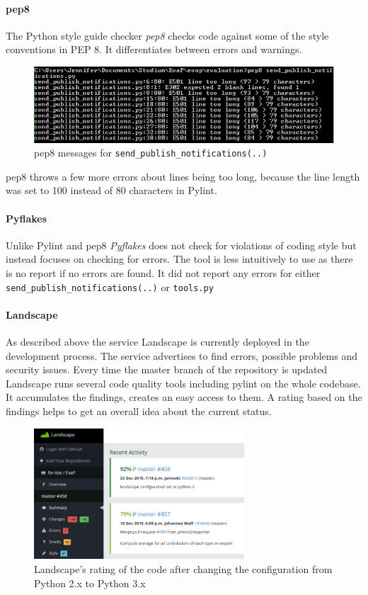 \paragraph{pep8}
The Python style guide checker \emph{pep8} checks code against some of the style conventions in PEP 8.
It differentiates between errors and warnings.
\begin{figure}[h]
    \centering
    \includegraphics[width=\textwidth, keepaspectratio]{graphics/pep8_send_publish_notifications_1}
    \caption{pep8 messages for \texttt{send\_publish\_notifications(..)}}
    \label{fig:pep8}
\end{figure} 
pep8 throws a few more errors about lines being too long, because the line length was set to 100 instead of 80 characters in Pylint.

\paragraph{Pyflakes}
Unlike Pylint and pep8 \emph{Pyflakes} does not check for violations of coding style but instead focuses on checking for errors.
The tool is less intuitively to use as there is no report if no errors are found. 
It did not report any errors for either \texttt{send\_publish\_notifications(..)} or \texttt{tools.py}

\paragraph{Landscape}
As described above the service Landscape is currently deployed in the development process. 
The service advertises to find errors, possible problems and security issues.
Every time the master branch of the repository is updated Landscape runs several code quality tools including pylint on the whole codebase. 
It accumulates the findings, creates an easy access to them.
A rating based on the findings helps to get an overall idea about the current status.

\begin{figure}[h]
    \centering
    \includegraphics[width=0.7\textwidth, keepaspectratio]{graphics/landscape_python3}
    \caption{Landscape's rating of the code after changing the configuration from Python 2.x to Python 3.x}
    \label{fig:landscape_python3}
\end{figure} 


